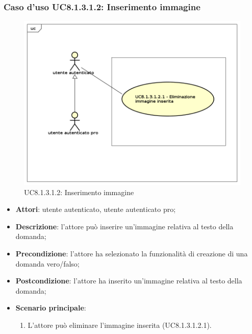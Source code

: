 \subsubsection{Caso d'uso UC8.1.3.1.2: Inserimento immagine}
	\label{UC8.1.3.1.2}
	\begin{figure}[h]
		\centering
			\includegraphics[scale=0.45,keepaspectratio]{UML/UC8_1_3_1_2.png}
		\caption{UC8.1.3.1.2: Inserimento immagine}
	\end{figure}
	\FloatBarrier
	\begin{itemize}
		\item
			\textbf{Attori}: utente autenticato, utente autenticato pro;
		\item		
			\textbf{Descrizione}: l'attore può inserire un'immagine relativa al testo della domanda;
		\item
			\textbf{Precondizione}: l'attore ha selezionato la funzionalità di creazione di una domanda vero/falso; 
		\item
			\textbf{Postcondizione}: l'attore ha inserito un'immagine relativa al testo della domanda;
		\item
			\textbf{Scenario principale}: 
			\begin{enumerate}
				\item
					L'attore può eliminare l'immagine inserita (UC8.1.3.1.2.1).	
			\end{enumerate}						
	\end{itemize}
	
